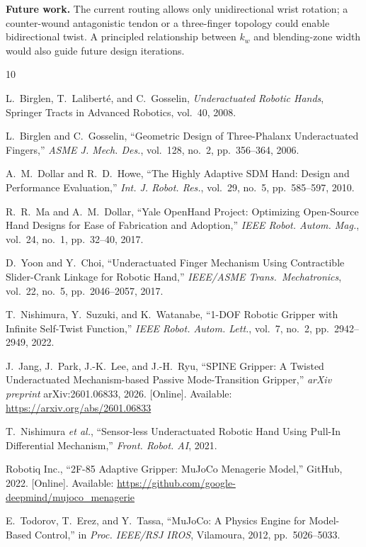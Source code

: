 \documentclass[10pt,twocolumn]{article}
\begin{document}
\textbf{Future work.}
The current routing allows only unidirectional wrist rotation; a counter-wound antagonistic tendon or a three-finger topology could enable bidirectional twist. A principled relationship between $k_w$ and blending-zone width would also guide future design iterations.

\balance
\begin{thebibliography}{10}
\small

L.~Birglen, T.~Laliberté, and C.~Gosselin,
\textit{Underactuated Robotic Hands},
Springer Tracts in Advanced Robotics, vol.~40, 2008.

L.~Birglen and C.~Gosselin,
``Geometric Design of Three-Phalanx Underactuated Fingers,''
\textit{ASME J. Mech. Des.}, vol.~128, no.~2, pp.~356--364, 2006.

A.~M.~Dollar and R.~D.~Howe,
``The Highly Adaptive SDM Hand: Design and Performance Evaluation,''
\textit{Int. J. Robot. Res.}, vol.~29, no.~5, pp.~585--597, 2010.

R.~R.~Ma and A.~M.~Dollar,
``Yale OpenHand Project: Optimizing Open-Source Hand Designs for
  Ease of Fabrication and Adoption,''
\textit{IEEE Robot. Autom. Mag.}, vol.~24, no.~1, pp.~32--40, 2017.

D.~Yoon and Y.~Choi,
``Underactuated Finger Mechanism Using Contractible Slider-Crank Linkage
  for Robotic Hand,''
\textit{IEEE/ASME Trans.\ Mechatronics}, vol.~22, no.~5, pp.~2046--2057,
2017.

T.~Nishimura, Y.~Suzuki, and K.~Watanabe,
``1-DOF Robotic Gripper with Infinite Self-Twist Function,''
\textit{IEEE Robot. Autom. Lett.}, vol.~7, no.~2,
pp.~2942--2949, 2022.

J.~Jang, J.~Park, J.-K.~Lee, and J.-H.~Ryu,
``SPINE Gripper: A Twisted Underactuated Mechanism-based Passive
  Mode-Transition Gripper,''
\textit{arXiv preprint} arXiv:2601.06833, 2026.
[Online]. Available: \url{https://arxiv.org/abs/2601.06833}

T.~Nishimura \emph{et al.},
``Sensor-less Underactuated Robotic Hand Using Pull-In Differential
  Mechanism,''
\textit{Front. Robot. AI}, 2021.

Robotiq Inc.,
``2F-85 Adaptive Gripper: MuJoCo Menagerie Model,''
GitHub, 2022.
[Online]. Available:
\url{https://github.com/google-deepmind/mujoco_menagerie}

E.~Todorov, T.~Erez, and Y.~Tassa,
``MuJoCo: A Physics Engine for Model-Based Control,''
in \textit{Proc. IEEE/RSJ IROS}, Vilamoura, 2012, pp.~5026--5033.

\end{thebibliography}
\end{document}
